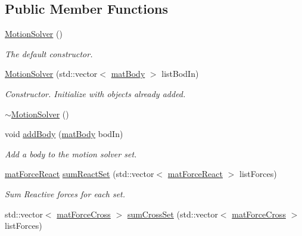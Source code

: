 \subsection*{Public Member Functions}
\begin{DoxyCompactItemize}
\item 
\hypertarget{classosea_1_1ofreq_1_1_motion_solver_a4dbc64bfeff4aab69a723c142292f787}{\hyperlink{classosea_1_1ofreq_1_1_motion_solver_a4dbc64bfeff4aab69a723c142292f787}{Motion\-Solver} ()}\label{classosea_1_1ofreq_1_1_motion_solver_a4dbc64bfeff4aab69a723c142292f787}

\begin{DoxyCompactList}\small\item\em The default constructor. \end{DoxyCompactList}\item 
\hyperlink{classosea_1_1ofreq_1_1_motion_solver_ab36901f6e752808a439890cde1c210ce}{Motion\-Solver} (std\-::vector$<$ \hyperlink{classosea_1_1ofreq_1_1mat_body}{mat\-Body} $>$ list\-Bod\-In)
\begin{DoxyCompactList}\small\item\em Constructor. Initialize with objects already added. \end{DoxyCompactList}\item 
\hyperlink{classosea_1_1ofreq_1_1_motion_solver_ae1fb5f389752a21a6d65ce41599b9b91}{$\sim$\-Motion\-Solver} ()
\item 
void \hyperlink{classosea_1_1ofreq_1_1_motion_solver_a79603cb6fede30d405f247a4d37256c1}{add\-Body} (\hyperlink{classosea_1_1ofreq_1_1mat_body}{mat\-Body} bod\-In)
\begin{DoxyCompactList}\small\item\em Add a body to the motion solver set. \end{DoxyCompactList}\item 
\hyperlink{classosea_1_1ofreq_1_1mat_force_react}{mat\-Force\-React} \hyperlink{classosea_1_1ofreq_1_1_motion_solver_a2345f18f82f306010659124421d5fe34}{sum\-React\-Set} (std\-::vector$<$ \hyperlink{classosea_1_1ofreq_1_1mat_force_react}{mat\-Force\-React} $>$ list\-Forces)
\begin{DoxyCompactList}\small\item\em Sum Reactive forces for each set. \end{DoxyCompactList}\item 
std\-::vector$<$ \hyperlink{classosea_1_1ofreq_1_1mat_force_cross}{mat\-Force\-Cross} $>$ \hyperlink{classosea_1_1ofreq_1_1_motion_solver_a3b8939bbea9a8a260a022ed175d25d6d}{sum\-Cross\-Set} (std\-::vector$<$ \hyperlink{classosea_1_1ofreq_1_1mat_force_cross}{mat\-Force\-Cross} $>$ list\-Forces)

\end{DoxyCompactItemize}
